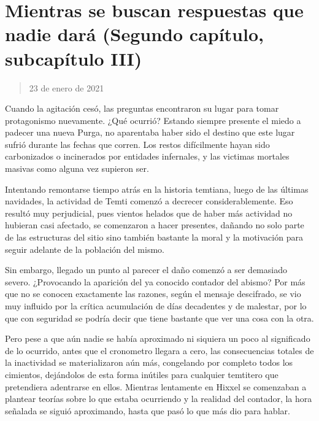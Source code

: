\documentclass[
  spanish,
]{book}
\begin{document}
\hypertarget{mientras-se-buscan-respuestas-que-nadie-daruxe1-segundo-capuxedtulo-subcapuxedtulo-iii}{%
\section{Mientras se buscan respuestas que nadie dará (Segundo capítulo, subcapítulo III)}\label{mientras-se-buscan-respuestas-que-nadie-daruxe1-segundo-capuxedtulo-subcapuxedtulo-iii}}

\begin{quote}
23 de enero de 2021
\end{quote}

Cuando la agitación cesó, las preguntas encontraron su lugar para tomar protagonismo nuevamente. ¿Qué ocurrió?
Estando siempre presente el miedo a padecer una nueva Purga, no aparentaba haber sido el destino que este lugar sufrió durante las fechas que corren. Los restos difícilmente hayan sido carbonizados o incinerados por entidades infernales, y las victimas mortales masivas como alguna vez supieron ser.

Intentando remontarse tiempo atrás en la historia temtiana, luego de las últimas navidades, la actividad de Temti comenzó a decrecer considerablemente. Eso resultó muy perjudicial, pues vientos helados que de haber más actividad no hubieran casi afectado, se comenzaron a hacer presentes, dañando no solo parte de las estructuras del sitio sino también bastante la moral y la motivación para seguir adelante de la población del mismo.

Sin embargo, llegado un punto al parecer el daño comenzó a ser demasiado severo. ¿Provocando la aparición del ya conocido contador del abismo?
Por más que no se conocen exactamente las razones, según el mensaje descifrado, se vio muy influido por la crítica acumulación de días decadentes y de malestar, por lo que con seguridad se podría decir que tiene bastante que ver una cosa con la otra.

Pero pese a que aún nadie se había aproximado ni siquiera un poco al significado de lo ocurrido, antes que el cronometro llegara a cero, las consecuencias totales de la inactividad se materializaron aún más, congelando por completo todos los cimientos, dejándolos de esta forma inútiles para cualquier temtitero que pretendiera adentrarse en ellos. Mientras lentamente en Hixxel se comenzaban a plantear teorías sobre lo que estaba ocurriendo y la realidad del contador, la hora señalada se siguió aproximando, hasta que pasó lo que más dio para hablar.
\end{document}
